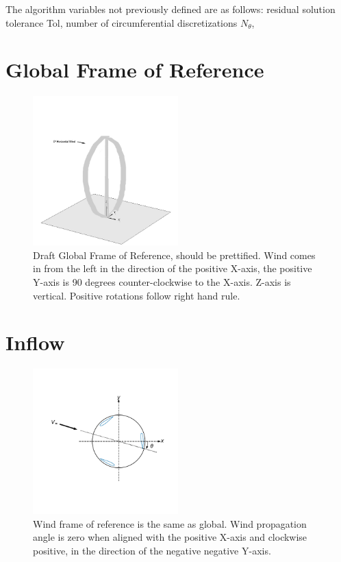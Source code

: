 \documentclass[11pt]{article}
\begin{document}
 The algorithm variables not previously defined are as follows: residual solution tolerance Tol, number of circumferential discretizations $N_{\theta}$,

\section{Global Frame of Reference}

\begin{figure}[H]
\centering
\vspace{-12pt}
\includegraphics[trim={0 0 0 0},clip,width=0.5\textwidth]{./figs/global_FOR.png}
\vspace{-12pt}
\caption{Draft Global Frame of Reference, should be prettified.  Wind comes in from the left in the direction of the positive X-axis, the positive Y-axis is 90 degrees counter-clockwise to the X-axis.  Z-axis is vertical.  Positive rotations follow right hand rule.}
\label{fig:ac_velocities}
\end{figure}

\section{Inflow}

\begin{figure}[H]
\centering
\vspace{-12pt}
\includegraphics[trim={1.3cm 2.4cm .5cm 1.5cm},clip,width=0.5\textwidth]{./figs/inflow_wind}
\vspace{-12pt}
\caption{Wind frame of reference is the same as global.  Wind propagation angle is zero when aligned with the positive X-axis and clockwise positive, in the direction of the negative negative Y-axis.}
\label{fig:ac_velocities}
\end{figure}
\end{document}
